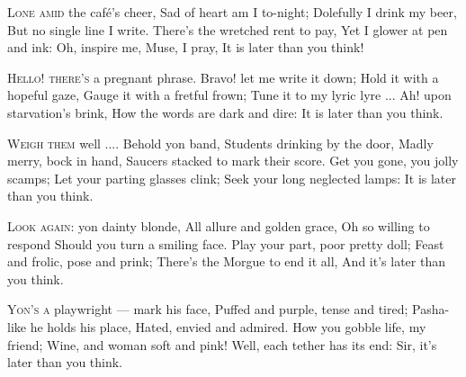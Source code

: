 \documentclass[fontsize=9, a5paper]{scrbook}
\begin{document}
\begin{poem}
	\begin{stanza}
		\textsc{Lone amid} the café’s cheer,\verseline
		Sad of heart am I to-night;\verseline
		Dolefully I drink my beer,\verseline
		But no single line I write.\verseline
		There’s the wretched rent to pay,\verseline
		Yet I glower at pen and ink:\verseline
		Oh, inspire me, Muse, I pray,\verseline
		It is later than you think!
	\end{stanza}
	
	\begin{stanza}
		\textsc{Hello! there’s} a pregnant phrase.\verseline
		Bravo! let me write it down;\verseline
		Hold it with a hopeful gaze,\verseline
		Gauge it with a fretful frown;\verseline
		Tune it to my lyric lyre ...   \verseline
		Ah! upon starvation’s brink,\verseline
		How the words are dark and dire:\verseline
		It is later than you think.
	\end{stanza}
	
	\begin{stanza}
		\textsc{Weigh them} well .... Behold yon band,\verseline
		Students drinking by the door,\verseline
		Madly merry, bock in hand,\verseline
		Saucers stacked to mark their score.\verseline
		Get you gone, you jolly scamps;\verseline
		Let your parting glasses clink;\verseline
		Seek your long neglected lamps:\verseline
		It is later than you think.
	\end{stanza}
	
	\begin{stanza}
		\textsc{Look again:} yon dainty blonde,\verseline
		All allure and golden grace,\verseline
		Oh so willing to respond\verseline
		Should you turn a smiling face.\verseline
		Play your part, poor pretty doll;\verseline
		Feast and frolic, pose and prink;\verseline
		There’s the Morgue to end it all,\verseline
		And it’s later than you think.
	\end{stanza}
	
	\begin{stanza}
		\textsc{Yon’s a} playwright — mark his face,\verseline
		Puffed and purple, tense and tired;\verseline
		Pasha-like he holds his place,\verseline
		Hated, envied and admired.\verseline
		How you gobble life, my friend;\verseline
		Wine, and woman soft and pink!\verseline
		Well, each tether has its end:\verseline
		Sir, it’s later than you think.
	\end{stanza}
	

\end{poem}
\end{document}
